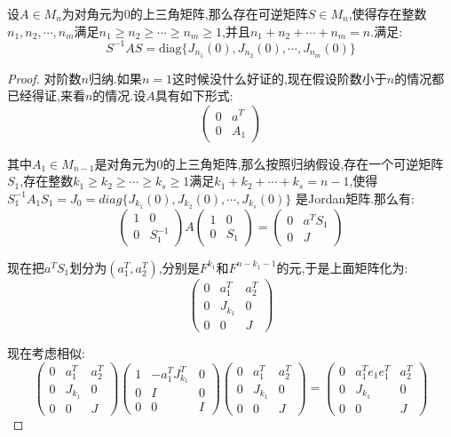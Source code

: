 设$A\in M_n$为对角元为0的上三角矩阵,那么存在可逆矩阵$S\in M_n$,使得存在整数$n_1,n_2,\cdots,n_m$满足$n_1\ge n_2\ge\cdots\ge n_m\ge1$,并且$n_1+n_2+\cdots+n_m=n$.满足:
$$S^{-1}AS=\mathrm{diag}\{J_{n_1}(0),J_{n_2}(0),\cdots,J_{n_m}(0)\}$$

\begin{proof}
	
	对阶数$n$归纳.如果$n=1$这时候没什么好证的,现在假设阶数小于$n$的情况都已经得证,来看$n$的情况.设$A$具有如下形式:
	$$\left(\begin{array}{cc}
	0&a^T\\
	0&A_1
	\end{array}\right)$$
	
	其中$A_1\in M_{n-1}$是对角元为0的上三角矩阵,那么按照归纳假设,存在一个可逆矩阵$S_1$,存在整数$k_1\ge k_2\ge\cdots\ge k_s\ge1$满足$k_1+k_2+\cdots+k_s=n-1$,使得$S_1^ {-1}A_1S_1=J_0=diag\{J_{k_1}(0),J_{k_2}(0),\cdots,J_{k_s}(0)\}$
	是Jordan矩阵.那么有:
	$$\left(\begin{array}{cc}
	1&0\\
	0&S_1^{-1}
	\end{array}\right)A\left(\begin{array}{cc}
	1&0\\
	0&S_1
	\end{array}\right)=\left(\begin{array}{cc}
	0&a^TS_1\\
	0&J
	\end{array}\right)$$
	
	现在把$a^TS_1$划分为$(a_1^T,a_2^T)$,分别是$F^{k_1}$和$F^{n-k_1-1}$的元,于是上面矩阵化为:
	$$\left(\begin{array}{ccc}
	0&a_1^T&a_2^T\\
	0&J_{k_1}&0\\
	0&0&J
	\end{array}\right)$$
	
	现在考虑相似:
	$$\left(\begin{array}{ccc}
	0&a_1^T&a_2^T\\
	0&J_{k_1}&0\\
	0&0&J
	\end{array}\right)\left(\begin{array}{ccc}
	1&-a_1^TJ_{k_1}^T&0\\
	0&I&0\\
	0&0&I
	\end{array}\right)\left(\begin{array}{ccc}
	0&a_1^T&a_2^T\\
	0&J_{k_1}&0\\
	0&0&J
	\end{array}\right)=\left(\begin{array}{ccc}
	0&a_1^Te_1e_1^T&a_2^T\\
	0&J_{k_1}&0\\
	0&0&J
	\end{array}\right)$$
	

\end{proof}
